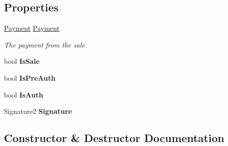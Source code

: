 \subsection*{Properties}
\begin{DoxyCompactItemize}
\item 
\hyperlink{classcom_1_1clover_1_1sdk_1_1v3_1_1payments_1_1_payment}{Payment} \hyperlink{classcom_1_1clover_1_1remotepay_1_1sdk_1_1_payment_response_a6a08d55412ab1aec30c30fe0262ffb9c}{Payment}
\begin{DoxyCompactList}\small\item\em The payment from the sale \end{DoxyCompactList}\item 
\mbox{\label{classcom_1_1clover_1_1remotepay_1_1sdk_1_1_payment_response_abcab1ec38c7b407f3426054abf39d581}} 
bool {\bfseries Is\+Sale}
\item 
\mbox{\label{classcom_1_1clover_1_1remotepay_1_1sdk_1_1_payment_response_a1bb5961682a7274009315c6f7322f057}} 
bool {\bfseries Is\+Pre\+Auth}
\item 
\mbox{\label{classcom_1_1clover_1_1remotepay_1_1sdk_1_1_payment_response_af7e32b0eb6bc49c8cff5d4e5ef5d2889}} 
bool {\bfseries Is\+Auth}
\item 
\mbox{\label{classcom_1_1clover_1_1remotepay_1_1sdk_1_1_payment_response_aa0cb7dcf8ea0525b02afe84eae8220d0}} 
Signature2 {\bfseries Signature}
\end{DoxyCompactItemize}


\subsection{Constructor \& Destructor Documentation}
\mbox{\label{classcom_1_1clover_1_1remotepay_1_1sdk_1_1_payment_response_a78b60aba6e82269bc92535d36bbb0c8c}} 
